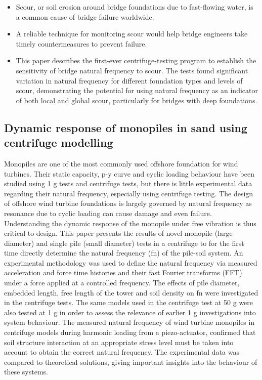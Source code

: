 \documentclass[
  letterpaper,
  DIV=11,
  numbers=noendperiod]{scrreprt}
\providecommand{\tightlist}{%
  \setlength{\itemsep}{0pt}\setlength{\parskip}{0pt}}\usepackage{longtable,booktabs,array}
\begin{document}
\begin{itemize}
\tightlist
\item
  Scour, or soil erosion around bridge foundations due to fast-flowing
  water, is a common cause of bridge failure worldwide.
\item
  A reliable technique for monitoring scour would help bridge engineers
  take timely countermeasures to prevent failure.
\item
  This paper describes the first-ever centrifuge-testing program to
  establish the sensitivity of bridge natural frequency to scour. The
  tests found significant variation in natural frequency for different
  foundation types and levels of scour, demonstrating the potential for
  using natural frequency as an indicator of both local and global
  scour, particularly for bridges with deep foundations.
\end{itemize}

\hypertarget{dynamic-response-of-monopiles-in-sand-using-centrifuge-modelling}{%
\subsection{Dynamic response of monopiles in sand using centrifuge
modelling}\label{dynamic-response-of-monopiles-in-sand-using-centrifuge-modelling}}

Monopiles are one of the most commonly used offshore foundation for wind
turbines. Their static capacity, p-y curve and cyclic loading behaviour
have been studied using 1 g tests and centrifuge tests, but there is
little experimental data regarding their natural frequency, especially
using centrifuge testing. The design of offshore wind turbine
foundations is largely governed by natural frequency as resonance due to
cyclic loading can cause damage and even failure. Understanding the
dynamic response of the monopile under free vibration is thus critical
to design. This paper presents the results of novel monopile (large
diameter) and single pile (small diameter) tests in a centrifuge to for
the first time directly determine the natural frequency (fn) of the
pile-soil system. An experimental methodology was used to define the
natural frequency via measured acceleration and force time histories and
their fast Fourier transforms (FFT) under a force applied at a
controlled frequency. The effects of pile diameter, embedded length,
free length of the tower and soil density on fn were investigated in the
centrifuge tests. The same models used in the centrifuge test at 50 g
were also tested at 1 g in order to assess the relevance of earlier 1 g
investigations into system behaviour. The measured natural frequency of
wind turbine monopiles in centrifuge models during harmonic loading from
a piezo-actuator, confirmed that soil structure interaction at an
appropriate stress level must be taken into account to obtain the
correct natural frequency. The experimental data was compared to
theoretical solutions, giving important insights into the behaviour of
these systems.
\end{document}
